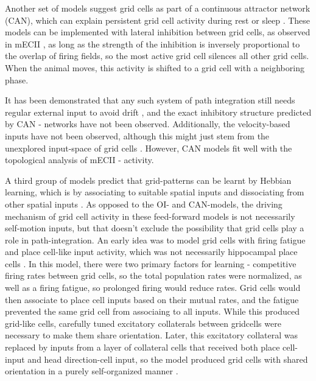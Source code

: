 \documentclass{article}
\begin{document}
    Another set of models suggest grid cells as part of a continuous attractor network (CAN), which can explain persistent grid cell activity during rest or sleep \parencite{Yoon2013,Widloski2014}. These models can be implemented with lateral inhibition between grid cells, as observed in mECII \parencite{Couey2013}, as long as the strength of the inhibition is inversely proportional to the overlap of firing fields, so the most active grid cell silences all other grid cells. When the animal moves, this activity is shifted to a grid cell with a neighboring phase.

    It has been demonstrated that any such system of path integration still needs regular external input to avoid drift \parencite{Mulas2016}, and the exact inhibitory structure predicted by CAN - networks have not been observed. Additionally, the velocity-based inputs have not been observed, although this might just stem from the unexplored input-space of grid cells \parencite{Zilli2012}. However, CAN models fit well with the topological analysis of mECII - activity.

    A third group of models predict that grid-patterns can be learnt by Hebbian learning, which is by associating to suitable spatial inputs and dissociating from other spatial inputs \parencite{Soldatkina2021}. As opposed to the OI- and CAN-models, the driving mechanism of grid cell activity in these feed-forward models is not necessarily self-motion inputs, but that doesn't exclude the possibility that grid cells play a role in path-integration. An early idea was to model grid cells with firing fatigue and place cell-like input activity, which was not necessarily hippocampal place cells \parencite{Kropff2008}. In this model, there were two primary factors for learning - competitive firing rates between grid cells, so the total population rates were normalized, as well as a firing fatigue, so prolonged firing would reduce rates. Grid cells would then associate to place cell inputs based on their mutual rates, and the fatigue prevented the same grid cell from associaing to all inputs. While this produced grid-like cells, carefully tuned excitatory collaterals between gridcells were necessary to make them share orientation.
    Later, this excitatory collateral was replaced by inputs from a layer of collateral cells that received both place cell-input and head direction-cell input, so the model produced grid cells with shared orientation in a purely self-organized manner \parencite{Si2013}.
\end{document}
